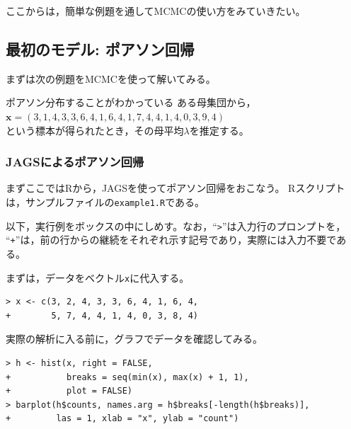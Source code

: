 \documentclass[11pt,uplatex]{jsarticle}
\begin{document}
ここからは，簡単な例題を通してMCMCの使い方をみていきたい。

\subsection{最初のモデル: ポアソン回帰}

まずは次の例題をMCMCを使って解いてみる。

\vspace{1zw}

\hspace{18mm}
\begin{minipage}{100mm}
\begin{breakbox}
ポアソン分布することがわかっている ある母集団から，\\
\hspace{10mm} $\bm{x} = (3, 1, 4, 3, 3, 6, 4, 1, 6, 4, 
       1, 7, 4, 4, 1, 4, 0, 3, 9, 4)$\\
という標本が得られたとき，その母平均$\lambda$を推定する。
\end{breakbox}
\end{minipage}

\vspace{1zw}

\subsubsection{JAGSによるポアソン回帰}

まずここでは\textsf{R}から，\textsf{JAGS}を使ってポアソン回帰をおこなう。
\textsf{R}スクリプトは，サンプルファイルの\texttt{example1.R}である。

\vspace{1.5zw}
\begin{screen}
以下，実行例をボックスの中にしめす。なお，``\texttt{>}''は入力行のプロンプトを，
``\texttt{+}''は，前の行からの継続をそれぞれ示す記号であり，実際には入力不要である。
\end{screen}
\vspace{0.5zw}

まずは，データをベクトル\texttt{x}に代入する。
\begin{lstlisting}
> x <- c(3, 2, 4, 3, 3, 6, 4, 1, 6, 4,
+        5, 7, 4, 4, 1, 4, 0, 3, 8, 4)
\end{lstlisting}

実際の解析に入る前に，グラフでデータを確認してみる。
\begin{lstlisting}
> h <- hist(x, right = FALSE,
+           breaks = seq(min(x), max(x) + 1, 1),
+           plot = FALSE)
> barplot(h$counts, names.arg = h$breaks[-length(h$breaks)],
+         las = 1, xlab = "x", ylab = "count")
\end{lstlisting}
\end{document}
